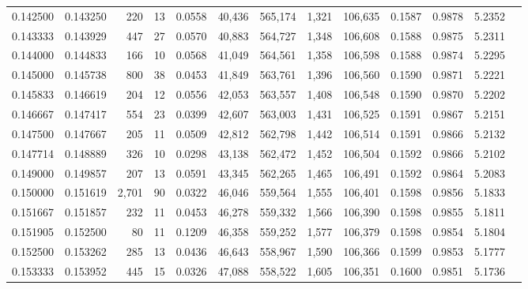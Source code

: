 \begin{tabular}{rrrrrrrrrrrrr}
0.142500 & 0.143250 &   220 &  13 &                                     0.0558 &  40,436 & 565,174 &   1,321 & 106,635 & 0.1587 & 0.9878 & 5.2352 \\
0.143333 & 0.143929 &   447 &  27 &                                     0.0570 &  40,883 & 564,727 &   1,348 & 106,608 & 0.1588 & 0.9875 & 5.2311 \\
0.144000 & 0.144833 &   166 &  10 &                                     0.0568 &  41,049 & 564,561 &   1,358 & 106,598 & 0.1588 & 0.9874 & 5.2295 \\
0.145000 & 0.145738 &   800 &  38 &                                     0.0453 &  41,849 & 563,761 &   1,396 & 106,560 & 0.1590 & 0.9871 & 5.2221 \\
0.145833 & 0.146619 &   204 &  12 &                                     0.0556 &  42,053 & 563,557 &   1,408 & 106,548 & 0.1590 & 0.9870 & 5.2202 \\
0.146667 & 0.147417 &   554 &  23 &                                     0.0399 &  42,607 & 563,003 &   1,431 & 106,525 & 0.1591 & 0.9867 & 5.2151 \\
0.147500 & 0.147667 &   205 &  11 &                                     0.0509 &  42,812 & 562,798 &   1,442 & 106,514 & 0.1591 & 0.9866 & 5.2132 \\
0.147714 & 0.148889 &   326 &  10 &                                     0.0298 &  43,138 & 562,472 &   1,452 & 106,504 & 0.1592 & 0.9866 & 5.2102 \\
0.149000 & 0.149857 &   207 &  13 &                                     0.0591 &  43,345 & 562,265 &   1,465 & 106,491 & 0.1592 & 0.9864 & 5.2083 \\
0.150000 & 0.151619 & 2,701 &  90 &                                     0.0322 &  46,046 & 559,564 &   1,555 & 106,401 & 0.1598 & 0.9856 & 5.1833 \\
0.151667 & 0.151857 &   232 &  11 &                                     0.0453 &  46,278 & 559,332 &   1,566 & 106,390 & 0.1598 & 0.9855 & 5.1811 \\
0.151905 & 0.152500 &    80 &  11 &                                     0.1209 &  46,358 & 559,252 &   1,577 & 106,379 & 0.1598 & 0.9854 & 5.1804 \\
0.152500 & 0.153262 &   285 &  13 &                                     0.0436 &  46,643 & 558,967 &   1,590 & 106,366 & 0.1599 & 0.9853 & 5.1777 \\
0.153333 & 0.153952 &   445 &  15 &                                     0.0326 &  47,088 & 558,522 &   1,605 & 106,351 & 0.1600 & 0.9851 & 5.1736 \\

\end{tabular}
